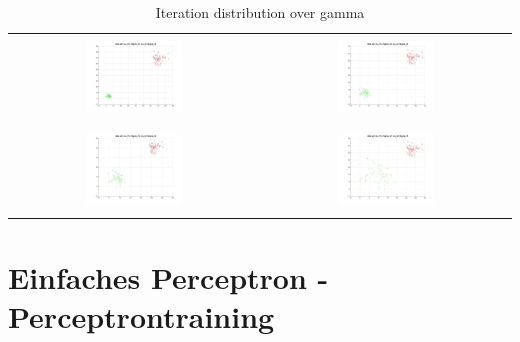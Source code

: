 \documentclass[]{report}
\begin{document}
\begin{table}[h]
\begin{tabular}{| c | c |}
\hline
 & \\
\includegraphics[width=0.4\textwidth]{./images/DataSet_100.jpg} & \includegraphics[width=0.4\textwidth]{./images/DataSet_200.jpg} \\
 & \\
\hline
 & \\
\includegraphics[width=0.4\textwidth]{./images/DataSet_300.jpg} & \includegraphics[width=0.4\textwidth]{./images/DataSet_400.jpg} \\
 & \\
\hline
\end{tabular}
\caption{Iteration distribution over gamma}
\label{tab:DataSets}
\end{table}

\section{Einfaches Perceptron - Perceptrontraining}
\end{document}
